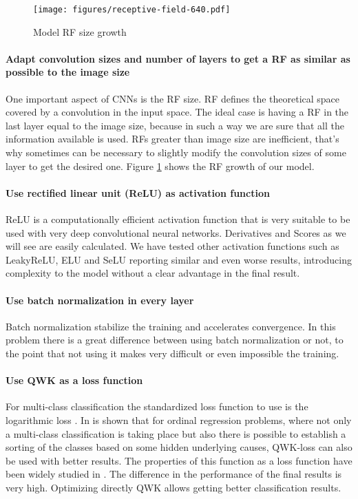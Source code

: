 \documentclass[preprint]{elsarticle}
\theoremstyle{definition} %
\theoremstyle{remark}
\begin{document}
\begin{figure}
	\centering
	\texttt{[image: figures/receptive-field-640.pdf]}
	\caption{Model RF size growth}
	\label{fig:rf_graph}
\end{figure}

\paragraph{Adapt convolution sizes and number of layers to get a RF as similar as possible to the image size} One important aspect of CNNs is the RF size. RF defines the theoretical space covered by a convolution in the input space. The ideal case is having a RF in the last layer equal to the image size, because in such a way we are sure that all the information available is used. RFs greater than image size are inefficient, that's why sometimes can be necessary to slightly modify the convolution sizes of some layer to get the desired one. Figure \ref{fig:rf_graph} shows the RF growth of our model.

\paragraph{Use rectified linear unit (ReLU) as activation function} ReLU is a computationally efficient activation function that is very suitable to be used with very deep convolutional neural networks\citep{Dahl2013}. Derivatives and Scores as we will see are easily calculated. We have tested other activation functions such as LeakyReLU, ELU and SeLU reporting similar and even worse results, introducing complexity to the model without a clear advantage in the final result.

\paragraph{Use batch normalization in every layer} Batch normalization \citep{batch-norm} stabilize the training and accelerates convergence. In this problem there is a great difference between using batch normalization or not, to the point that not using it makes very difficult or even impossible the training.

\paragraph{Use QWK as a loss function} For multi-class classification the standardized loss function to use is the logarithmic loss \citep{Goodfellow-et-al-2016}. In \citep{DELATORRE2017} is shown that for ordinal regression problems, where not only a multi-class classification is taking place but also there is possible to establish a sorting of the classes based on some hidden underlying causes, QWK-loss can also be used with better results. The properties of this function as a loss function have been widely studied in \cite{jdelatorre-2017}. The difference in the performance of the final results is very high. Optimizing directly QWK allows getting better classification results.
\end{document}
